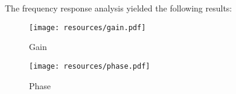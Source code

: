 The frequency response analysis yielded the following results:
\FloatBarrier  
\begin{figure} [!htb] 
  \texttt{[image: resources/gain.pdf]}
  \caption{Gain}
  \label{fig:theoplots}
  \hfill
\end{figure}
\FloatBarrier  

\FloatBarrier
\begin{figure} [!htb] 
  \texttt{[image: resources/phase.pdf]}
  \caption{Phase}
  \label{fig:theoplots}
  \endminipage\hfill
\end{figure}
\FloatBarrier


